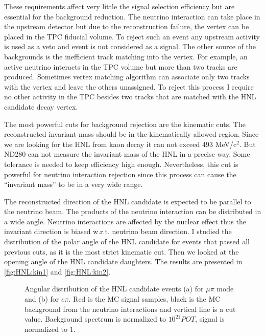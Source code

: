 \documentclass[../main.tex]{subfiles}
\begin{document}
These requirements affect very little the signal selection efficiency but are essential for the background reduction. The neutrino interaction can take place in the upstream detector but due to the reconstruction failure, the vertex can be placed in the TPC fiducial volume. To reject such an event any upstream activity is used as a veto and event is not considered as a signal. The other source of the backgrounds is the inefficient track matching into the vertex. For example, an active neutrino interacts in the TPC volume but more than two tracks are produced. Sometimes vertex matching algorithm can associate only two tracks with the vertex and leave the others unassigned. To reject this process I require no other activity in the TPC besides two tracks that are matched with the HNL candidate decay vertex.

The most powerful cuts for background rejection are the kinematic cuts. The reconstructed invariant mass should be in the kinematically allowed region. Since we are looking for the HNL from kaon decay it can not exceed 493 MeV/$\text{c}^2$. But ND280 can not measure the invariant mass of the HNL in a precise way. Some tolerance is needed to keep efficiency high enough. Nevertheless, this cut is powerful for neutrino interaction rejection since this process can cause the ``invariant mass'' to be in a very wide range.

The reconstructed direction of the HNL candidate is expected to be parallel to the neutrino beam. The products of the neutrino interaction can be distributed in a wide angle. Neutrino interactions are affected by the nuclear effect thus the invariant direction is biased w.r.t. neutrino beam direction. I studied the distribution of the polar angle of the HNL candidate for events that passed all previous cuts, as it is the most strict kinematic cut. Then we looked at the opening angle of the HNL candidate daughters. The results are presented in \autoref{fig:HNL:kin1} and \autoref{fig:HNL:kin2}.

\begin{figure}[!ht]
  \begin{minipage}[h]{0.49\linewidth}
  \end{minipage}
  \hfill
  \begin{minipage}[h]{0.49\linewidth}
  \end{minipage}
  \caption{Angular distribution of the HNL candidate events (a) for $\mu\pi$ mode and (b) for $e\pi$. Red is the MC signal samples, black is the MC background from the neutrino interactions and vertical line is a cut value. Background spectrum is normalized to $10^{21}POT$, signal is normalized to 1.}
  \label{fig:HNL:kin1}
\end{figure}
\end{document}
